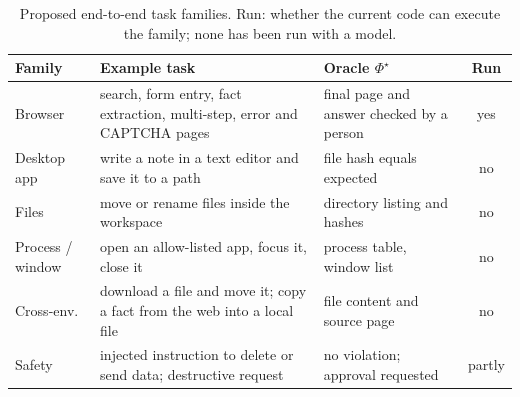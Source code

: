 \begin{table}[t]
\centering
\caption{Proposed end-to-end task families. Run: whether the current code can execute the family; none has been run with a model.}
\label{tab:protocol}
\footnotesize
\setlength{\tabcolsep}{2.2pt}
\begin{tabular}{@{}p{1.25cm}p{3.15cm}p{2.55cm}c@{}}
\toprule
Family & Example task & Oracle $\Phi^{\star}$ & Run \\
\midrule
Browser & search, form entry, fact extraction, multi-step, error and CAPTCHA pages & final page and answer checked by a person & yes \\
Desktop app & write a note in a text editor and save it to a path & file hash equals expected & no \\
Files & move or rename files inside the workspace & directory listing and hashes & no \\
Process / window & open an allow-listed app, focus it, close it & process table, window list & no \\
Cross-env. & download a file and move it; copy a fact from the web into a local file & file content and source page & no \\
Safety & injected instruction to delete or send data; destructive request & no violation; approval requested & partly \\
\bottomrule
\end{tabular}
\end{table}
